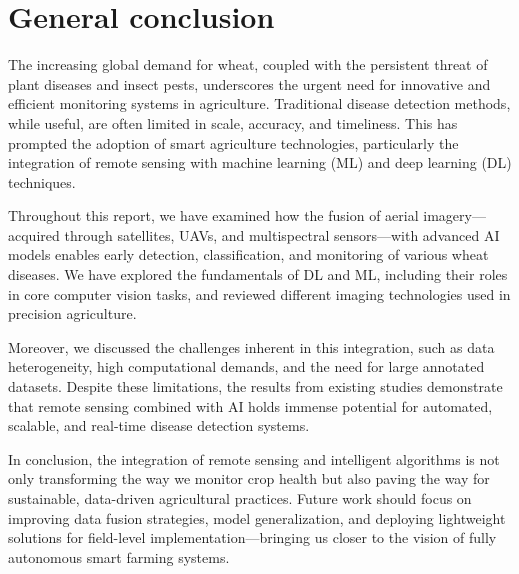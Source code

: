 \chapter*{General conclusion}
\label{chap.general-conclusion}

The increasing global demand for wheat, coupled with the persistent threat of plant diseases and insect pests, underscores the urgent need for innovative and efficient monitoring systems in agriculture. Traditional disease detection methods, while useful, are often limited in scale, accuracy, and timeliness. This has prompted the adoption of smart agriculture technologies, particularly the integration of remote sensing with machine learning (ML) and deep learning (DL) techniques.

Throughout this report, we have examined how the fusion of aerial imagery—acquired through satellites, UAVs, and multispectral sensors—with advanced AI models enables early detection, classification, and monitoring of various wheat diseases. We have explored the fundamentals of DL and ML, including their roles in core computer vision tasks, and reviewed different imaging technologies used in precision agriculture.

Moreover, we discussed the challenges inherent in this integration, such as data heterogeneity, high computational demands, and the need for large annotated datasets. Despite these limitations, the results from existing studies demonstrate that remote sensing combined with AI holds immense potential for automated, scalable, and real-time disease detection systems.

In conclusion, the integration of remote sensing and intelligent algorithms is not only transforming the way we monitor crop health but also paving the way for sustainable, data-driven agricultural practices. Future work should focus on improving data fusion strategies, model generalization, and deploying lightweight solutions for field-level implementation—bringing us closer to the vision of fully autonomous smart farming systems.